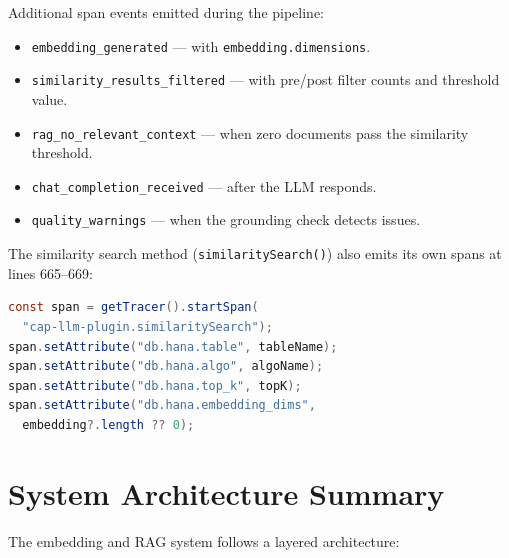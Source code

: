 \documentclass[11pt]{article}
\begin{document}
Additional span events emitted during the pipeline:
\begin{itemize}
  \item \texttt{embedding\_generated} --- with \texttt{embedding.dimensions}.
  \item \texttt{similarity\_results\_filtered} --- with pre/post filter counts and
        threshold value.
  \item \texttt{rag\_no\_relevant\_context} --- when zero documents pass the
        similarity threshold.
  \item \texttt{chat\_completion\_received} --- after the LLM responds.
  \item \texttt{quality\_warnings} --- when the grounding check detects issues.
\end{itemize}

The similarity search method (\texttt{similaritySearch()}) also emits its own
spans at lines 665--669:
\begin{lstlisting}[language=Java,caption={Similarity search spans --- lines 665--669}]
const span = getTracer().startSpan(
  "cap-llm-plugin.similaritySearch");
span.setAttribute("db.hana.table", tableName);
span.setAttribute("db.hana.algo", algoName);
span.setAttribute("db.hana.top_k", topK);
span.setAttribute("db.hana.embedding_dims",
  embedding?.length ?? 0);
\end{lstlisting}

\section{System Architecture Summary}
\label{sec:architecture}

The embedding and RAG system follows a layered architecture:
\end{document}
